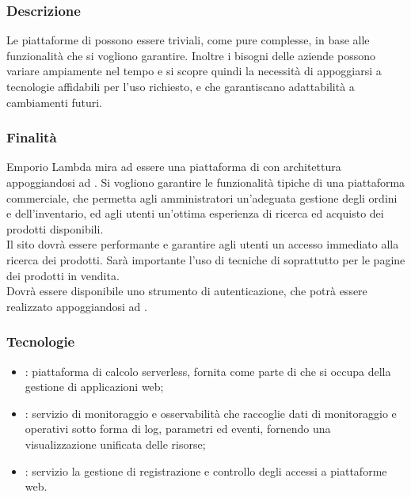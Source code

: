 \documentclass[]{article}
\begin{document}
			\subsubsection{Descrizione}
			Le piattaforme di  possono essere triviali, come pure complesse, in base alle funzionalità che si vogliono garantire. Inoltre i bisogni delle aziende possono variare ampiamente nel tempo e si scopre quindi la necessità di appoggiarsi a tecnologie affidabili per l'uso richiesto, e che garantiscano adattabilità a cambiamenti futuri.

			\subsubsection{Finalità}
			Emporio Lambda mira ad essere una piattaforma di  con architettura  appoggiandosi ad . Si vogliono garantire le funzionalità tipiche di una piattaforma commerciale, che permetta agli amministratori un'adeguata gestione degli ordini e dell'inventario, ed agli utenti un'ottima esperienza di ricerca ed acquisto dei prodotti disponibili.
			\\
			Il sito dovrà essere performante e garantire agli utenti un accesso immediato alla ricerca dei prodotti. Sarà importante l'uso di tecniche di  soprattutto per le pagine dei prodotti in vendita.
			\\
			Dovrà essere disponibile uno strumento di autenticazione, che potrà essere realizzato appoggiandosi ad .

			\subsubsection{Tecnologie}
			\begin{itemize}
				\item \textsc{:} piattaforma di calcolo serverless, fornita come parte di  che si occupa della gestione  di applicazioni web;
				\item \textsc{:} servizio di monitoraggio e osservabilità che raccoglie dati di monitoraggio e operativi sotto forma di log, parametri ed eventi, fornendo una visualizzazione unificata delle risorse;
				\item \textsc{:} servizio la gestione di registrazione e controllo degli accessi a piattaforme web.
			\end{itemize}
\end{document}
